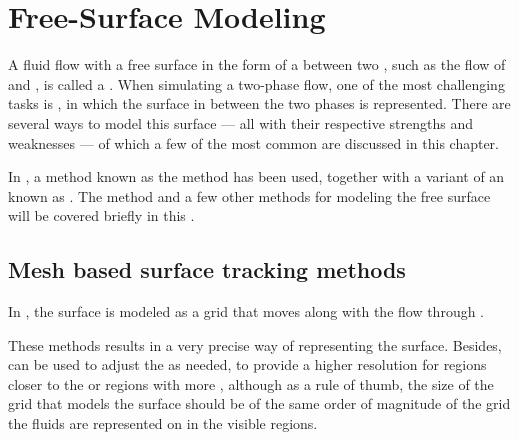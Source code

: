 \chapter{Free-Surface Modeling}
\label{chap:freesurfacemodeling}

A fluid flow with a free surface in the form of a  between two , such as the flow of \water and \air, is called a . When simulating a two-phase flow, one of the most challenging tasks is \FSM, in which the surface in between the two phases is represented. There are several ways to model this surface --- all with their respective strengths and weaknesses --- of which a few of the most common are discussed in this chapter.

In \thisprojectwork, a method known as the \VOF method has been used, together with a variant of an  known as . The \VOF method and a few other methods for modeling the free surface will be covered briefly in this \levelname.



\section{Mesh based surface tracking methods}

In , the surface is modeled as a grid that moves along with the flow through .

These methods results in a very precise way of representing the surface. Besides,  can be used to adjust the  as needed, to provide a higher resolution for regions closer to the \camera or regions with more \turbulence, although as a rule of thumb, the size of the grid that models the surface should be of the same order of magnitude of the grid the fluids are represented on in the visible regions.

